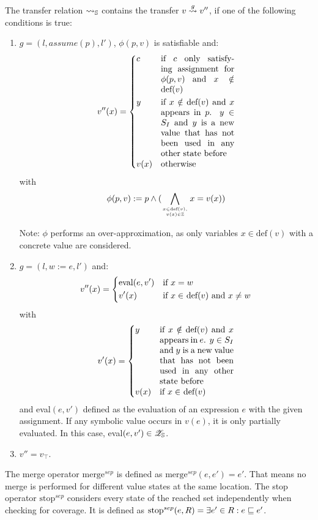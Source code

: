 The transfer relation $\rightsquigarrow_{\mathbb{S}}$ contains the transfer $v \overset{g}{\rightsquigarrow} v''$, if one of the following conditions is true:
    \begin{enumerate}[1.]
      \item $g = (l, assume(p), l')$, $\phi (p, v)$ is satisfiable and:
        \[
          v''(x) = \begin{dcases}
            c    & \parbox[t]{.25\textwidth}{if $c$ only satisfying assignment for $\phi (p, v)$ and $x \notin$ def$(v)$}\\
            y    & \parbox[t]{.25\textwidth}{if $x \notin \text{def}(v)$ and $x$ appears in $p$. $y \in S_I$ and $y$ is a new value that has not been used in any other state before}\\
            v(x) & \text{otherwise}              
          \end{dcases}
        \]
        with \[\phi (p, v) := p \wedge (\displaystyle\bigwedge_{x \in \text{def}(v),\atop {v(x) \in \mathbb{Z}}} x = v(x))\]

        Note: $\phi$ performs an over-approximation, as only variables $x \in \text{def}(v)$ with a concrete value are considered.

      \item $g = (l, w := e, l')$ and:
        \[
          v''(x) = \begin{dcases}
            \text{eval}(e, v') & \text{if $x = w$} \\
            v'(x)       & \text{if $x \in$ def$(v)$ and $x \neq w$}
          \end{dcases}
        \]
      with \[
         v'(x) = \begin{dcases}
            y    & \parbox[t]{.25\textwidth}{if $x \notin \text{def}(v)$ and $x$ appears in $e$. $y \in S_I$ and $y$ is a new value that has not been used in any other state before}\\
            v(x) & \text{if $x \in$ def$(v)$}
          \end{dcases}
      \]
      and eval$(e, v')$ defined as the evaluation of an expression $e$ with the given assignment.
      If any symbolic value occurs in $v(e)$, it is only partially evaluated. In this case, eval$(e, v') \in \mathscr{Z}_{\mathbb{S}}$.

      \item $v'' = v_\top$.
    \end{enumerate}
The merge operator $\text{merge}^{sep}$ is defined as $\text{merge}^{sep}(e, e') = e'$.
That means no merge is performed for different value states at the same location.
The stop operator $\text{stop}^{sep}$ considers every state of the reached set independently when checking for coverage.
It is defined as $\text{stop}^{sep}(e, R) = \exists e' \in R: e \sqsubseteq e'$.
